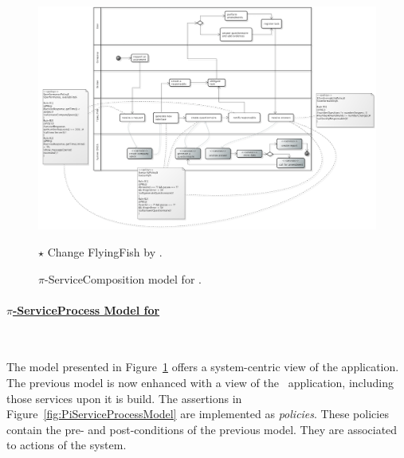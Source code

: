 \begin{figure}[t]
\centering
\includegraphics[width=1.0\textwidth]{figs/ServiceCompositionGeneralCut.png}
{\color{red} \raggedright
$\star$ Change FlyingFish by \FlyingPig.
}
\caption{$\pi$-ServiceComposition model for \FlyingPig.\label{fig:PiServiceCompositionModel}}
\end{figure}

\paragraph{\underline{$\pi$-ServiceProcess Model for \FlyingPig}}~

The model presented in Figure~\ref{fig:PiServiceCompositionModel} offers a system-centric view of the application.
The previous model is now enhanced with a view of the \FlyingPig\ application, including those services upon  it is build.
The assertions in Figure~\ref{fig:PiServiceProcessModel} are implemented as \textit{policies}.
These policies contain the pre- and post-conditions of the previous model.
They are associated to actions of the system.


